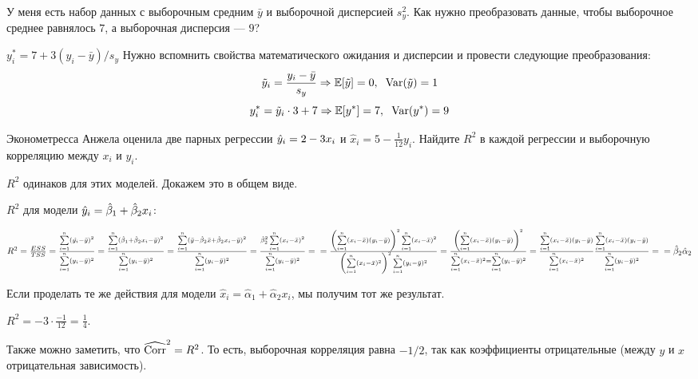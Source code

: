 \begin{problem} %
У меня есть набор данных с выборочным средним $\bar{y}$ и выборочной дисперсией $s_y^2$. Как нужно преобразовать данные, чтобы выборочное среднее равнялось $7$, а выборочная дисперсия — $9$?


\begin{sol}
$y_i^*=7+3(y_i-\bar{y})/s_y$
Нужно вспомнить свойства математического ожидания и дисперсии и провести следующие преобразования:
\[
\tilde{y}_i = \frac{y_i-\bar{y}}{s_y} \Rightarrow \mathbb{E}[\tilde{y}] = 0, \hspace{2mm} \operatorname{Var}(\tilde{y}) = 1
\]
\[
y^*_i = \tilde{y}_i\cdot3 + 7 \Rightarrow \mathbb{E}[y^*] = 7, \hspace{2mm} \operatorname{Var}(y^*) = 9
\]
\end{sol}
\end{problem}



\begin{problem} %
Эконометресса Анжела оценила две парных регрессии $\hat{y}_i = 2 - 3 x_i$  и $\hat x_i = 5 - \frac{1}{12}y_i$. Найдите $R^2$ в каждой регрессии и выборочную корреляцию между $x_i$ и $y_i$.
\begin{sol}

$R^2$ одинаков для этих моделей. Докажем это в общем виде.

$R^2$ для модели $\hat{y}_i = \hat{\beta}_1 +\hat{\beta}_2 x_i$:

\begin{math}
R^2 = \frac{ESS}{TSS}= \frac{\sum\limits_{i=1}^n (\hat{y_i} - \bar{y})^2}{\sum\limits_{i=1}^n(y_i-\bar{y})^2}=\frac{\sum\limits_{i=1}^n(\hat{\beta}_1 + \hat{\beta}_2x_i - \bar{y})^2}{\sum\limits_{i=1}^n(y_i-\bar{y})^2}=\frac{\sum\limits_{i=1}^n(\bar{y} - \hat{\beta}_2\bar{x} + \hat{\beta}_2x_i - \bar{y})^2}{\sum\limits_{i=1}^n(y_i-\bar{y})^2}  = \frac{\hat{\beta}_2^2 \sum\limits_{i=1}^n(x_i - \bar{x})^2}{\sum\limits_{i=1}^n(y_i-\bar{y})^2} = \\ = \frac{ \left( \sum\limits_{i=1}^n(x_i-\bar{x})(y_i - \bar{y}) \right)^2 \sum\limits_{i=1}^n(x_i - \bar{x})^2}{\left( \sum\limits_{i=1}^n(x_i - \bar{x})^2 \right)^2 \sum\limits_{i=1}^n(y_i-\bar{y})^2} = \frac{ \left( \sum\limits_{i=1}^n(x_i-\bar{x})(y_i - \bar{y}) \right)^2}{\sum\limits_{i=1}^n(x_i - \bar{x})^2 = \sum\limits_{i=1}^n(y_i-\bar{y})^2} = \frac{\sum\limits_{i=1}^n(x_i-\bar{x})(y_i - \bar{y})}{\sum\limits_{i=1}^n(x_i - \bar{x})^2} \frac{\sum\limits_{i=1}^n(x_i-\bar{x})(y_i - \bar{y})}{\sum\limits_{i=1}^n(y_i-\bar{y})^2} = \\ = \hat{\beta}_2 \hat{\alpha}_2
\end{math}

Если проделать те же действия для модели $\hat x_i = \hat{\alpha}_1 +\hat{\alpha}_2 x_i$, мы получим тот же результат.

$R^2 = -3 \cdot \frac{-1}{12}=\frac{1}{4}$.

Также можно заметить, что $\widehat{\operatorname{Corr}}^2 = R^2$. То есть, выборочная корреляция равна $-1/2$, так как коэффициенты отрицательные (между \(y\) и \(x\) отрицательная зависимость).
\end{sol}
\end{problem}

